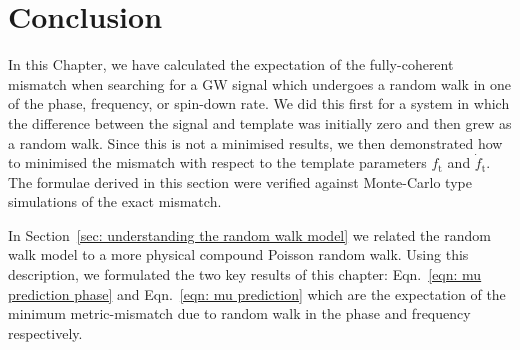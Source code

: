 \documentclass[../full_thesis/full_thesis.tex]{subfiles}
\newcommand{\thisdir}{../analytic_timing_noise_cgw}
\begin{document}
{%
%


\section{Conclusion}

In this Chapter, we have calculated the expectation of the fully-coherent
mismatch when searching for a GW signal which undergoes a random walk in one of
the phase, frequency, or spin-down rate. We did this first for a system in
which the difference between the signal and template was initially zero and
then grew as a random walk. Since this is not a minimised results, we then
demonstrated how to minimised the mismatch with respect to the template
parameters $f_\textrm{t}$ and $\dot{f}_\textrm{t}$. The formulae derived in
this section were verified against Monte-Carlo type simulations of the exact
mismatch.

In Section~\ref{sec: understanding the random walk model} we related the random
walk model to a more physical compound Poisson random walk. Using this
description, we formulated the two key results of this chapter:
Eqn.~\eqref{eqn: mu prediction phase} and Eqn.~\eqref{eqn: mu prediction} which
are the expectation of the minimum metric-mismatch due to random walk in the
phase and frequency respectively.

}
\end{document}
